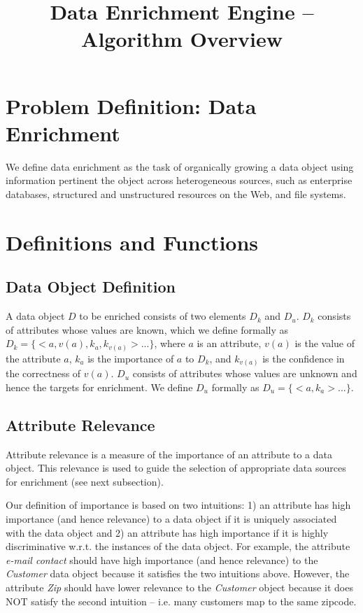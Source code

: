 \documentclass{article}
\begin{document}
\title{Data Enrichment Engine -- Algorithm Overview}
\date{}
\maketitle

\section{Problem Definition: Data Enrichment}

We define data enrichment as the task of organically growing a data object using information pertinent the object 
across heterogeneous sources, such as enterprise databases, structured and unstructured resources on the Web, and 
file systems. 


\section{Definitions and Functions}

\subsection{Data Object Definition}

A data object $D$ to be enriched consists of two elements $D_k$ and $D_u$. $D_k$ consists of attributes whose 
values are known, which we define formally as $D_k= \lbrace <a,v(a),k_a,k_{v(a)}> ... \rbrace$, where $a$ is 
an attribute, $v(a)$ is the value of the attribute $a$, $k_a$ is the importance of $a$ to $D_k$, and $k_{v(a)}$ 
is the confidence in the correctness of $v(a)$. $D_u$ consists of attributes whose values are unknown and hence 
the targets for enrichment. We define $D_u$ formally as $D_u= \lbrace <a,k_a> ... \rbrace$.
    
\subsection{Attribute Relevance} 

Attribute relevance is a measure of the importance of an attribute to a data object. This relevance is used 
to guide the selection of appropriate data sources for enrichment (see next subsection).

Our definition of importance is based on two intuitions: 1) an attribute has high importance (and hence 
relevance) to a data object if it is uniquely associated with the data object and 2) an attribute has high 
importance if it is highly discriminative w.r.t. the instances of the data object. For example, the attribute 
{\it e-mail contact} should have high importance (and hence relevance) to the {\it Customer} data object 
because it satisfies the two intuitions above. However, the attribute {\it Zip} should have lower relevance
to the {\it Customer} object because it does NOT satisfy the second intuition -- i.e. many customers map
to the same zipcode.
\end{document}
